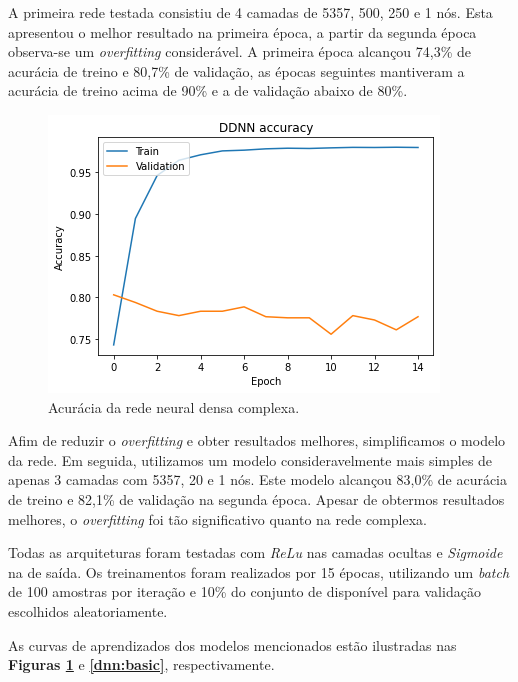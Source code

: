 \documentclass[twoside,conference,a4paper]{IEEEtran}
\begin{document}
A primeira rede testada consistiu de 4 camadas de 5357, 500, 250 e 1 nós. Esta apresentou o melhor resultado na primeira época, a partir da segunda época observa-se um \textit{overfitting} considerável. A primeira época alcançou 74,3\% de acurácia de treino e 80,7\% de validação, as épocas seguintes mantiveram a acurácia de treino acima de 90\% e a de validação abaixo de 80\%.

\begin{figure}[ht]
\centering
\includegraphics[width=0.8\hsize]{figuras/dnn_complex.png}
\caption{Acurácia da rede neural densa complexa.}
\label{dnn:complex}
\end{figure}

Afim de reduzir o \textit{overfitting} e obter resultados melhores, simplificamos o modelo da rede. Em seguida, utilizamos um modelo consideravelmente mais simples de apenas 3 camadas com 5357, 20 e 1 nós. Este modelo alcançou 83,0\% de acurácia de treino e 82,1\% de validação na segunda época. Apesar de obtermos resultados melhores, o \textit{overfitting} foi tão significativo quanto na rede complexa.

Todas as arquiteturas foram testadas com \textit{ReLu} nas camadas ocultas e \textit{Sigmoide} na de saída. Os treinamentos foram realizados por 15 épocas, utilizando um \textit{batch} de 100 amostras por iteração e 10\% do conjunto de disponível para validação escolhidos aleatoriamente.

As curvas de aprendizados dos modelos mencionados estão ilustradas nas \textbf{Figuras \ref{dnn:complex}} e \textbf{\ref{dnn:basic}}, respectivamente.
\end{document}
